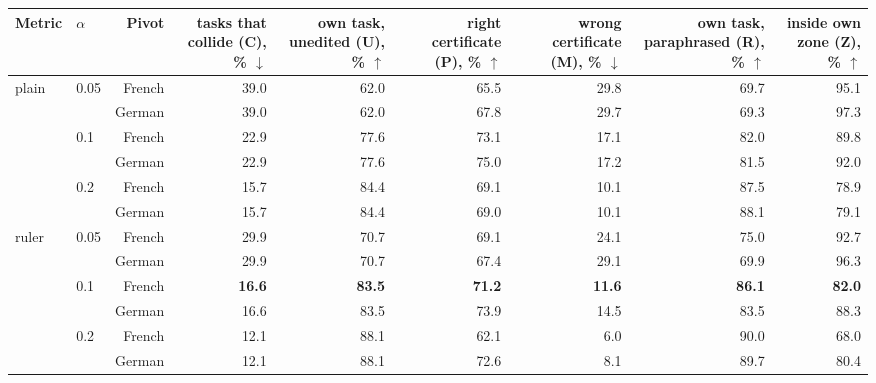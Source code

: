 \begin{tabular}{llrrrrrrr}
    \toprule
    Metric & $\alpha$ & Pivot & \shortstack[r]{tasks that\\collide\\(\textsf{C}), \% $\downarrow$} & \shortstack[r]{own task,\\unedited\\(\textsf{U}), \% $\uparrow$} & \shortstack[r]{right\\certificate\\(\textsf{P}), \% $\uparrow$} & \shortstack[r]{wrong\\certificate\\(\textsf{M}), \% $\downarrow$} & \shortstack[r]{own task,\\paraphrased\\(\textsf{R}), \% $\uparrow$} & \shortstack[r]{inside own\\zone\\(\textsf{Z}), \% $\uparrow$} \\
    \midrule
    plain & 0.05 & French & 39.0 & 62.0 & 65.5 & 29.8 & 69.7 & 95.1 \\
     &  & German & 39.0 & 62.0 & 67.8 & 29.7 & 69.3 & 97.3 \\
    \addlinespace[2pt]
     & 0.1 & French & 22.9 & 77.6 & 73.1 & 17.1 & 82.0 & 89.8 \\
     &  & German & 22.9 & 77.6 & 75.0 & 17.2 & 81.5 & 92.0 \\
    \addlinespace[2pt]
     & 0.2 & French & 15.7 & 84.4 & 69.1 & 10.1 & 87.5 & 78.9 \\
     &  & German & 15.7 & 84.4 & 69.0 & 10.1 & 88.1 & 79.1 \\
    \addlinespace[2pt]
    \midrule
    ruler & 0.05 & French & 29.9 & 70.7 & 69.1 & 24.1 & 75.0 & 92.7 \\
     &  & German & 29.9 & 70.7 & 67.4 & 29.1 & 69.9 & 96.3 \\
    \addlinespace[2pt]
     & 0.1 & French & \textbf{16.6} & \textbf{83.5} & \textbf{71.2} & \textbf{11.6} & \textbf{86.1} & \textbf{82.0} \\
     &  & German & 16.6 & 83.5 & 73.9 & 14.5 & 83.5 & 88.3 \\
    \addlinespace[2pt]
     & 0.2 & French & 12.1 & 88.1 & 62.1 & 6.0 & 90.0 & 68.0 \\
     &  & German & 12.1 & 88.1 & 72.6 & 8.1 & 89.7 & 80.4 \\
    \bottomrule
\end{tabular}
